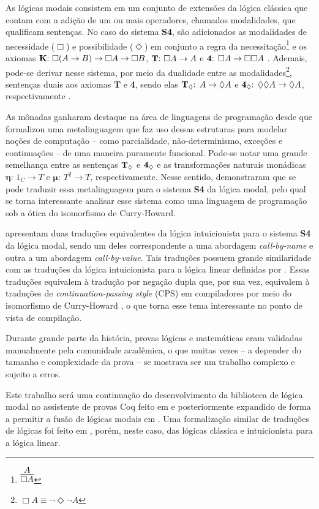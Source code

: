 
As lógicas modais consistem em um conjunto de extensões da lógica clássica que contam com a adição de um ou mais operadores, chamados modalidades, que qualificam sentenças. No caso do sistema \textbf{S4}, são adicionados as modalidades de necessidade ($\Box$) e possibilidade ($\Diamond$) em conjunto a regra da necessitação\footnote{$\infer{\Box A}{A}$} e os axiomas $\text{\textbf{K}: } \Box(A \to B) \to \Box A \to \Box B$, $\text{\textbf{T}: } \Box A \to A$ e $\text{\textbf{4}: } \Box A \to \Box \Box A$ \cite{Troelstra}. Ademais, pode-se derivar nesse sistema, por meio da dualidade entre as modalidades\footnote{$\Box A \equiv \neg \Diamond \neg A $}, sentenças duais aos axiomas \textbf{T} e \textbf{4}, sendo elas $\boldsymbol{\text{\textbf{T}}_\Diamond \text{: }} A \to \Diamond A$ e $\boldsymbol{\text{\textbf{4}}_\Diamond \text{: }} \Diamond \Diamond A \to \Diamond A$, respectivamente \cite{Zach}.

As mônadas ganharam destaque na área de linguagens de programação desde que \cite{Moggi1991} formalizou uma metalinguagem que faz uso dessas estruturas para modelar noções de computação -- como parcialidade, não-determinismo, exceções e continuações -- de uma maneira puramente funcional. Pode-se notar uma grande semelhança entre as sentenças $\boldsymbol{\text{\textbf{T}}_\Diamond}$ e $\boldsymbol{\text{\textbf{4}}_\Diamond}$ e as transformações naturais monádicas $\boldsymbol{\eta \text{: }} 1_C \to T$ e $\boldsymbol{\mu \text{: }} T^2 \to T$, respectivamente. Nesse sentido, \cite{Pfenning2001} demonstraram que se pode traduzir essa metalinguagem para o sistema \textbf{S4} da lógica modal, pelo qual se torna interessante analisar esse sistema como uma linguagem de programação sob a ótica do isomorfismo de Curry-Howard.

\cite{Troelstra} apresentam duas traduções equivalentes da lógica intuicionista para o sistema \textbf{S4} da lógica modal, sendo um deles correspondente a uma abordagem \textit{call-by-name} e outra a um abordagem \textit{call-by-value}. Tais traduções possuem grande similaridade com as traduções da lógica intuicionista para a lógica linear definidas por \cite{Girard1987}. Essas traduções equivalem à tradução por negação dupla que, por sua vez, equivalem à traduções de \textit{continuation-passing style} (CPS) em compiladores por meio do isomorfismo de Curry-Howard \cite{Reynolds}, o que torna esse tema interessante no ponto de vista de compilação. 

Durante grande parte da história, provas lógicas e matemáticas eram validadas manualmente pela comunidade acadêmica, o que muitas vezes -- a depender do tamanho e complexidade da prova -- se mostrava ser um trabalho complexo e sujeito a erros.

Este trabalho será uma continuação do desenvolvimento da biblioteca de lógica modal no assistente de provas Coq feito em \cite{Silveira} e posteriormente expandido de forma a permitir a fusão de lógicas modais em \cite{Nunes}. Uma formalização similar de traduções de lógicas foi feito em \cite{Sehnem}, porém, neste caso, das lógicas clássica e intuicionista para a lógica linear.